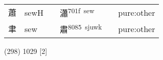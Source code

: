 \documentclass[14pt,a4paper]{scrartcl}
\begin{document}
\begin{longtable}[c]{@{}llllll@{}}
\begin{minipage}[t]{0.14\columnwidth}
蕭
\strut\end{minipage} &
\begin{minipage}[t]{0.14\columnwidth}\raggedright\strut
sewH
\strut\end{minipage} &
\begin{minipage}[t]{0.14\columnwidth}\raggedright\strut
\strut\end{minipage} &
\begin{minipage}[t]{0.14\columnwidth}\raggedright\strut
瀟\textsuperscript{701f~sew}
\strut\end{minipage} &
\begin{minipage}[t]{0.14\columnwidth}\raggedright\strut
\strut\end{minipage} &
\begin{minipage}[t]{0.14\columnwidth}\raggedright\strut
pure:other
\strut\end{minipage}\tabularnewline
\begin{minipage}[t]{0.14\columnwidth}\raggedright\strut
聿
\strut\end{minipage} &
\begin{minipage}[t]{0.14\columnwidth}\raggedright\strut
sew
\strut\end{minipage} &
\begin{minipage}[t]{0.14\columnwidth}\raggedright\strut
\strut\end{minipage} &
\begin{minipage}[t]{0.14\columnwidth}\raggedright\strut
肅\textsuperscript{8085~sjuwk}
\strut\end{minipage} &
\begin{minipage}[t]{0.14\columnwidth}\raggedright\strut
\strut\end{minipage} &
\begin{minipage}[t]{0.14\columnwidth}\raggedright\strut
pure:other
\strut\end{minipage}\tabularnewline
\bottomrule
\end{longtable}

(298) 1029 {[}2{]}
\end{document}
